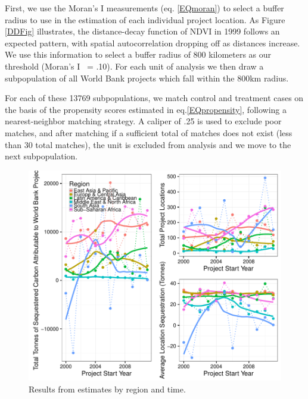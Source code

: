 \documentclass{article}\usepackage[]{graphicx}\usepackage[]{color}
\makeatletter
\def\maxwidth{ %
  \ifdim\Gin@nat@width>\linewidth
    \linewidth
  \else
    \Gin@nat@width
  \fi
}
\newenvironment{knitrout}{}{}  %
\makeatother
\begin{document}
\begin{knitrout}
First, we use the Moran's I measurements (eq. \ref{EQmoran}) to select a buffer radius to use in the estimation of each individual project location.
As Figure \ref{DDFig} illustrates, the distance-decay function of NDVI in 1999 follows an expected pattern, with spatial autocorrelation dropping off as distances increase.  
We use this information to select a buffer radius of 800 kilometers as our threshold (Moran's I ~= .10).  
For each unit of analysis we then draw a subpopulation of all World Bank projects which fall within the 800km radius.

\par
For each of these 13769 subpopulations, we match control and treatment cases on the basis of the propensity scores estimated in eq.\ref{EQpropensity}, following a nearest-neighbor matching strategy.  
A caliper of .25 is used to exclude poor matches, and after matching if a sufficient total of matches does not exist (less than 30 total matches), the unit is excluded from analysis and we move to the next subpopulation. 
\par

\begin{figure}\centering
\begin{Schunk}

\includegraphics[width=\maxwidth]{figure/Fig1-1} \end{Schunk}
\caption{Results from estimates by region and time.}
\label{result_fig}
\vspace{10pt}
\end{figure}  


\end{knitrout}
\end{document}
